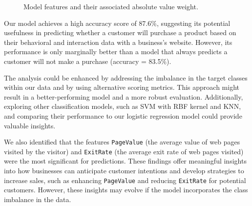 \documentclass[
  letterpaper,
  DIV=11,
  numbers=noendperiod]{scrartcl}
\begin{document}
\begin{figure}


\caption{\label{fig-feature_bar_plot}Model features and their associated
absolute value weight.}

\end{figure}%

Our model achieves a high accuracy score of 87.6\%, suggesting its
potential usefulness in predicting whether a customer will purchase a
product based on their behavioral and interaction data with a business's
website. However, its performance is only marginally better than a model
that always predicts a customer will not make a purchase (accuracy =
83.5\%).

The analysis could be enhanced by addressing the imbalance in the target
classes within our data and by using alternative scoring metrics. This
approach might result in a better-performing model and a more robust
evaluation. Additionally, exploring other classification models, such as
SVM with RBF kernel and KNN, and comparing their performance to our
logistic regression model could provide valuable insights.

We also identified that the features \texttt{PageValue} (the average
value of web pages visited by the visitor) and \texttt{ExitRate} (the
average exit rate of web pages visited) were the most significant for
predictions. These findings offer meaningful insights into how
businesses can anticipate customer intentions and develop strategies to
increase sales, such as enhancing \texttt{PageValue} and reducing
\texttt{ExitRate} for potential customers. However, these insights may
evolve if the model incorporates the class imbalance in the data.
\end{document}
